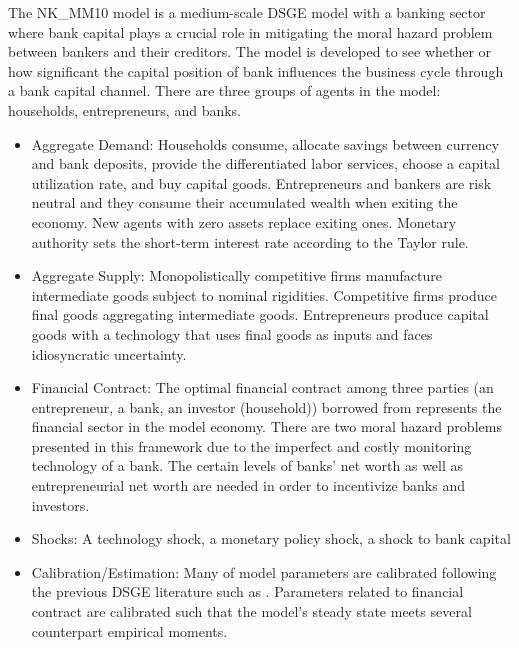 \documentclass[11pt,a4paper]{article}
\begin{document}
	The NK\_MM10 model is a medium-scale DSGE model with a banking sector where bank capital plays a crucial role in mitigating the moral hazard problem between bankers and their creditors. The model is developed to see whether or how significant the capital position of bank influences the business cycle through a bank capital channel. There are three groups of agents in the model: households, entrepreneurs, and banks.
	\begin{itemize}
		\item Aggregate Demand: Households consume, allocate savings between currency and bank deposits, provide the differentiated labor services, choose a capital utilization rate, and buy capital goods. Entrepreneurs and bankers are risk neutral and they consume their accumulated wealth when exiting the economy. New agents with zero assets replace exiting ones. Monetary authority sets the short-term interest rate according to the Taylor rule.
		
		\item Aggregate Supply: Monopolistically competitive firms manufacture intermediate goods subject to nominal rigidities. Competitive firms produce final goods aggregating intermediate goods. Entrepreneurs produce capital goods with a technology that uses final goods as inputs and faces idiosyncratic uncertainty.
		
		\item Financial Contract: The optimal financial contract among three parties (an entrepreneur, a bank, an investor (household)) borrowed from \cite{holmstromTirole1997} represents the financial sector in the model economy. There are two moral hazard problems presented in this framework due to the imperfect and costly monitoring technology of a bank. The certain levels of banks' net worth as well as entrepreneurial net worth are needed in order to incentivize banks and investors.
		
		\item Shocks: A technology shock, a monetary policy shock, a shock to bank capital
		
		\item Calibration/Estimation: Many of model parameters are calibrated following the previous DSGE literature such as \cite{ChristianoEichenbaumEvans2005}. Parameters related to financial contract are calibrated such that the model's steady state meets several counterpart empirical moments.
	\end{itemize}
	
\end{document}
